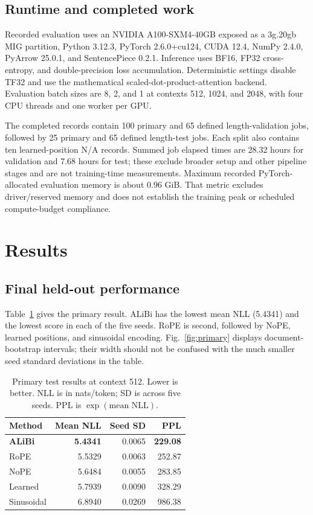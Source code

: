 \documentclass[conference]{IEEEtran}
\begin{document}
\subsection{Runtime and completed work}
Recorded evaluation uses an NVIDIA A100-SXM4-40GB exposed as a 3g.20gb MIG partition, Python 3.12.3, PyTorch 2.6.0+cu124, CUDA 12.4, NumPy 2.4.0, PyArrow 25.0.1, and SentencePiece 0.2.1. Inference uses BF16, FP32 cross-entropy, and double-precision loss accumulation. Deterministic settings disable TF32 and use the mathematical scaled-dot-product-attention backend. Evaluation batch sizes are 8, 2, and 1 at contexts 512, 1024, and 2048, with four CPU threads and one worker per GPU.

The completed records contain 100 primary and 65 defined length-validation jobs, followed by 25 primary and 65 defined length-test jobs. Each split also contains ten learned-position N/A records. Summed job elapsed times are 28.32 hours for validation and 7.68 hours for test; these exclude broader setup and other pipeline stages and are not training-time measurements. Maximum recorded PyTorch-allocated evaluation memory is about 0.96 GiB. That metric excludes driver/reserved memory and does not establish the training peak or scheduled compute-budget compliance.

\section{Results}
\subsection{Final held-out performance}
Table~\ref{tab:primary} gives the primary result. ALiBi has the lowest mean NLL (5.4341) and the lowest score in each of the five seeds. RoPE is second, followed by NoPE, learned positions, and sinusoidal encoding. Fig.~\ref{fig:primary} displays document-bootstrap intervals; their width should not be confused with the much smaller seed standard deviations in the table.

\begin{table}[t]
\caption{Primary test results at context 512. Lower is better. NLL is in nats/token; SD is across five seeds. PPL is $\exp(\text{mean NLL})$.}
\label{tab:primary}
\centering\small
\begin{tabular}{lrrr}
\toprule
Method & Mean NLL & Seed SD & PPL \\
\midrule
\textbf{ALiBi} & \textbf{5.4341} & 0.0065 & \textbf{229.08} \\
RoPE & 5.5329 & 0.0063 & 252.87 \\
NoPE & 5.6484 & 0.0055 & 283.85 \\
Learned & 5.7939 & 0.0090 & 328.29 \\
Sinusoidal & 6.8940 & 0.0269 & 986.38 \\
\bottomrule
\end{tabular}
\end{table}
\end{document}
